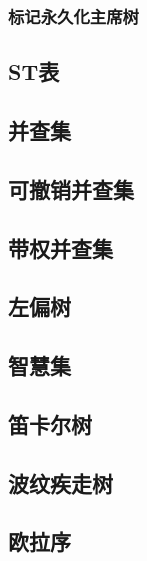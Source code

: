 \subsubsection{标记永久化主席树}


\subsection{ST表}


\subsection{并查集}


\subsection{可撤销并查集}

\subsection{带权并查集}


\subsection{左偏树}

\subsection{智慧集}


\subsection{笛卡尔树}

\subsection{波纹疾走树}


\subsection{欧拉序}

